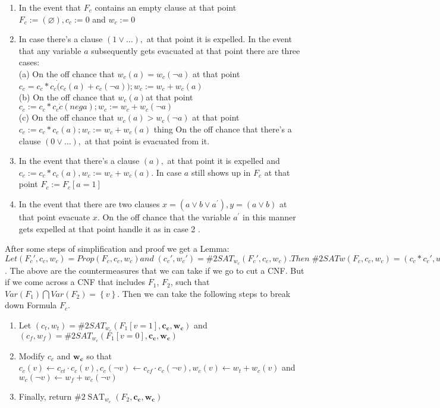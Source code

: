 \documentclass{sigchi}
\begin{document}
\begin{enumerate}
	\item In the event that $F_{c}$ contains an empty clause at that point $F_{c}:=(\varnothing), c_{c}:=0$ and $w_{c}:=0$
	\item In case there's a clause $(1 \vee \ldots),$ at that point it is expelled. In the event that any variable $a$ subsequently gets evacuated at that point there are three cases:\\
	(a) On the off chance that $w_{c}(a)=w_{c}(\neg a)$ at that point $c_{c}=c_{c} * c_{c}\dot(c_{c}(a)+c_{c}(\neg a)) ; w_{c}:=w_{c}+w_{c}(a)$\\
	(b) On the off chance that $w_{c}(a)$at that point $c_{c}:=c_{c}* c_{c}\dot c(neg a) ;w_{c}:=w_{c}+w_{c}(\neg a)$\\
	(c) On the off chance that $w_{c}(a)>w_{c}(\neg a)$ at that point $c_{c}:=c_{c} * c_{c}(a) ; w_{c}:=w_{c}+w_{c}(a)$ thing On the off chance that there's a clause $(0 \vee \ldots),$ at that point is evacuated from it.
	\item In the event that there's a clause $(a),$ at that point it is expelled and $c_{c}:=c_{c}* c_{c}(a), w_{c}:=w_{c}+w_{c}(a) .$ In case $a$ still shows up in $F_{c}$ at that point $F_{c}:=F_{c}[a=1]$
	\item In the event that there are two clauses $x=\left(a \vee b \vee a^{\prime}\right), y=(a \vee b)$ at that point evacuate $x$. On the off chance that the variable $a^{\prime}$ in this manner gets expelled at that point handle it as in case 2 .
\end{enumerate}
After some steps of simplification and proof we get a Lemma: $Let({F_{c}}',c_{c},w_{c})=Prop(F_{c},c_{c},w_{c}) and\;({c_{c}}',{w_{c}}')=\#2SAT_{w_{c}}({F_{c}}',c_{c},w_{c}). Then\; \#2SATw(F_{c} ,c_{c},w_{c})=(c_{c}*{c_{c}}',w_{c}+{w_{c}}')$. The above are the countermeasures that we can take if we go to cut a CNF. But if we come across a CNF that includes $F_{1}$, $F_{2}$, such that $Var(F_{1})\bigcap Var(F_2)=\left \{ v \right \} $. Then we can take the following steps to break down Formula $F_{c}$.
\begin{enumerate} 
	\item Let $\left(c_{t}, w_{t}\right)=\# 2 S A T_{w_{c}}\left(F_{1}[v=1], \mathbf{c_{c}}, \mathbf{w_{c}}\right)$ and $\left(c_{f}, w_{f}\right)=\# 2 S A T_{w_{c}}\left(F_{1}[v=0], \mathbf{c_{c}}, \mathbf{w_{c}}\right)$
	\item Modify $c_{c}$ and $\mathbf{w_{c}}$ so that $c_{c}(v) \leftarrow c_{ct} \cdot c_{c}(v), c_{c}(\neg v) \leftarrow c_{cf} \cdot c_{c}(\neg v), w_{c}(v) \leftarrow w_{t}+w_{c}(v)$ and
	$w_{c}(\neg v) \leftarrow w_{f}+w_{c}(\neg v)$
	\item Finally, return $\# 2 \operatorname{SAT}_{w_{c}}\left(F_{2}, \mathbf{c_{c}}, \mathbf{w_{c}}\right)$
\end{enumerate}
\end{document}
